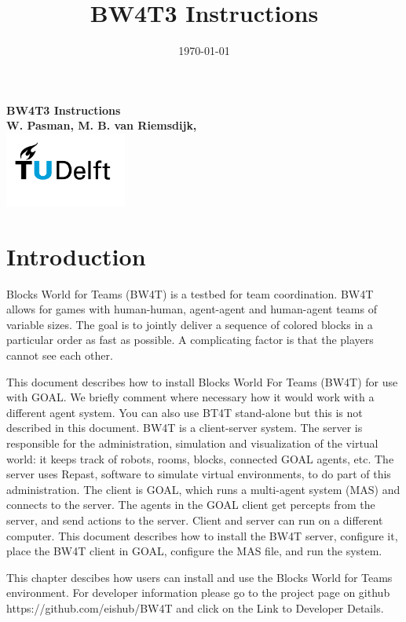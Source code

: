 \documentclass[11pt,a4paper]{article}
\title{BW4T3 Instructions}
\date{\today}
\begin{document}
\begin{titlepage}
    \centering
    \vfill
    {\bfseries\Large
        BW4T3 Instructions\\
        \vskip2cm
        W. Pasman, M. B. van Riemsdijk, \\
    }    
    \vfill
    \includegraphics[width=4cm]{TUD.png}
    \vfill
    \vfill
\end{titlepage}

\tableofcontents

\newpage

\section{Introduction}
Blocks World for Teams (BW4T) is a testbed for team coordination. BW4T allows for games with human-human, agent-agent and human-agent teams of variable sizes. The goal is to jointly deliver a sequence of colored blocks in a particular order as fast as possible. A complicating factor is that the players cannot see each other.

This document describes how to install Blocks World For Teams (BW4T) for use with GOAL. We briefly comment where necessary how it would work with a different agent system. You can also use BT4T stand-alone but this is not described in this document. BW4T is a client-server system. The server is responsible for the administration, simulation and visualization of the virtual world: it keeps track of robots, rooms, blocks, connected GOAL agents, etc. The server uses Repast, software to simulate virtual environments, to do part of this administration. The client is GOAL, which runs a multi-agent system (MAS) and connects to the server. The agents in the GOAL client get percepts from the server, and send actions to the server. Client and server can run on a different computer. This document describes how to install the BW4T server, configure it, place the BW4T client in GOAL, configure the MAS file, and run the system.

This chapter descibes how users can install and use the Blocks World for Teams environment. For developer information please go to the project page on github  https://github.com/eishub/BW4T and click on the Link to Developer Details.
\end{document}
